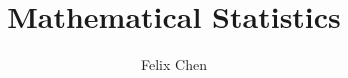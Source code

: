\documentclass{article}
\begin{document}
	\title{Mathematical Statistics}
	\author{Felix Chen}
	\date{}
	\maketitle
	\tableofcontents
	
\end{document}
